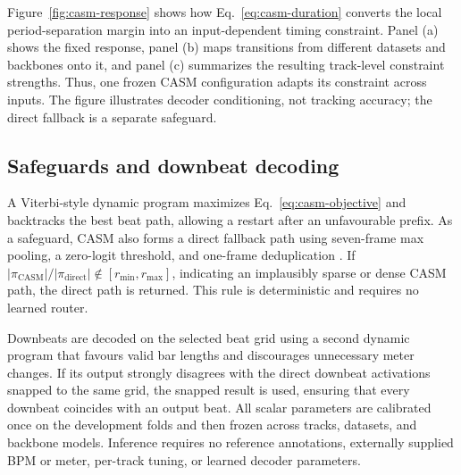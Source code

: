 \documentclass{article}
\begin{document}

Figure~\ref{fig:casm-response} shows how Eq.~\eqref{eq:casm-duration} converts the local period-separation margin into an input-dependent timing constraint. Panel (a) shows the fixed response, panel (b) maps transitions from different datasets and backbones onto it, and panel (c) summarizes the resulting track-level
constraint strengths. Thus, one frozen CASM configuration adapts its
constraint across inputs. The figure illustrates decoder conditioning,
not tracking accuracy; the direct fallback is a separate safeguard.

\subsection{Safeguards and downbeat decoding}
A Viterbi-style dynamic program maximizes
Eq.~\eqref{eq:casm-objective} and backtracks the best beat path, allowing
a restart after an unfavourable prefix. As a safeguard, CASM also forms
a direct fallback path using seven-frame max pooling, a zero-logit
threshold, and one-frame deduplication
\cite{foscarin2024beat}. If
$\lvert\pi_{\mathrm{CASM}}\rvert/
 \lvert\pi_{\mathrm{direct}}\rvert
 \notin[r_{\min},r_{\max}]$,
indicating an implausibly sparse or dense CASM path, the direct path is returned. This rule is deterministic and requires no learned router.

Downbeats are decoded on the selected beat grid using a second
dynamic program that favours valid bar lengths and discourages
unnecessary meter changes. If its output strongly disagrees with the
direct downbeat activations snapped to the same grid, the snapped result is used, ensuring that every downbeat coincides with an output beat. All scalar parameters are calibrated once on the development folds and then frozen across tracks, datasets, and backbone models. Inference
requires no reference annotations, externally supplied BPM or meter,
per-track tuning, or learned decoder parameters.
\end{document}
